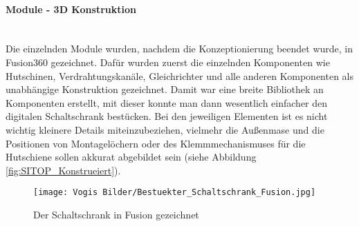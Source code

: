     \paragraph{Module - 3D Konstruktion}\mbox{}\\
    Die einzelnden Module wurden, nachdem die Konzeptionierung beendet wurde, in Fusion360 gezeichnet. Dafür wurden zuerst die einzelnden Komponenten wie Hutschinen, Verdrahtungskanäle, Gleichrichter und alle anderen Komponenten als unabhängige Konstruktion gezeichnet. Damit war eine breite Bibliothek an Komponenten erstellt, mit dieser konnte man dann wesentlich einfacher den digitalen Schaltschrank bestücken. Bei den jeweiligen Elementen ist es nicht wichtig kleinere Details miteinzubeziehen, vielmehr die Außenmase und die Positionen von Montagelöchern oder des Klemmmechanismuses für die Hutschiene sollen akkurat abgebildet sein (siehe Abbildung \ref{fig:SITOP_Konstrueiert}).
    \begin{figure}[h]
        \centering
        \texttt{[image: Vogis Bilder/Bestuekter\_Schaltschrank\_Fusion.jpg]}
        \caption{Der Schaltschrank in Fusion gezeichnet}
        \label{fig:Schaltschrank_bestueckt_Fusion}
    \end{figure}
